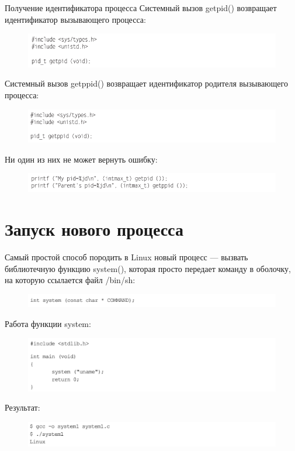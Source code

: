 \documentclass{beamer}
\begin{document}
\begin{frame}{Получение идентификатора процесса}
Системный вызов getpid() возвращает идентификатор вызывающего процесса:
\begin{figure}[h]
\centering
\includegraphics[scale=0.5]{images/lec07-pic01.png}
\end{figure}
Системный вызов getppid() возвращает идентификатор родителя вызывающего процесса:
\begin{figure}[h]
\centering
\includegraphics[scale=0.5]{images/lec07-pic02.png}
\end{figure}
Ни один из них не может вернуть ошибку:
\begin{figure}[h]
\centering
\includegraphics[scale=0.5]{images/lec07-pic03.png}
\end{figure}
\end{frame}

\section{Запуск нового процесса}

\begin{frame}
Самый простой способ породить в Linux новый процесс — вызвать библиотечную
функцию  system(), которая просто передает команду в оболочку, на которую ссылается файл /bin/sh:
\begin{figure}[h]
\centering
\includegraphics[scale=0.4]{images/lec07-pic17.png}
\end{figure}
Работа функции system:
\begin{figure}[h]
\centering
\includegraphics[scale=0.4]{images/lec07-pic18.png}
\end{figure}
Результат:
\begin{figure}[h]
\centering
\includegraphics[scale=0.4]{images/lec07-pic19.png}
\end{figure}
\end{frame}
\end{document}

